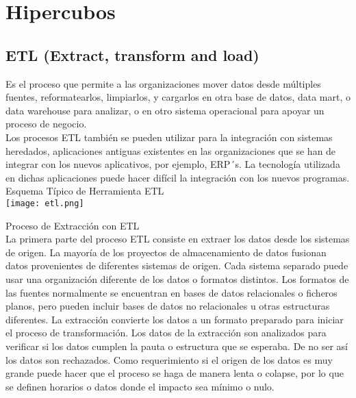 \documentclass[DIV=calc, paper=a4, fontsize=11pt, twocolumn]{scrartcl}	 %
\begin{document}





\section*{Hipercubos}

\subsection*{ETL (Extract, transform and load)}

Es el proceso que permite a las organizaciones mover datos desde m\'{u}ltiples fuentes, reformatearlos, limpiarlos, y cargarlos 
en otra base de datos, data mart, o data warehouse para analizar, o en otro sistema operacional para apoyar un proceso de negocio.\\
Los procesos ETL tambi\'{e}n se pueden utilizar para la integraci\'{o}n con sistemas heredados, aplicaciones antiguas existentes en 
las organizaciones que se han de integrar con los nuevos aplicativos, por ejemplo, ERP´s. La tecnolog\'{i}a utilizada en dichas 
aplicaciones puede hacer dif\'{i}cil la integraci\'{o}n con los nuevos programas.\\

Esquema T\'{i}pico de Herramienta ETL\\

\texttt{[image: etl.png]} 

Proceso de Extracci\'{o}n con ETL\\
La primera parte del proceso ETL consiste en extraer los datos desde los sistemas de origen. La mayor\'{i}a de los proyectos 
de almacenamiento de datos fusionan datos provenientes de diferentes sistemas de origen. Cada sistema separado puede usar
una organizaci\'{o}n diferente de los datos o formatos distintos. Los formatos de las fuentes normalmente se encuentran en 
bases de datos relacionales o ficheros planos, pero pueden incluir bases de datos no relacionales u otras estructuras 
diferentes. La extracci\'{o}n convierte los datos a un formato preparado para iniciar el proceso de transformaci\'{o}n.
Los datos de la extracci\'{o}n son analizados para verificar si los datos cumplen la pauta o estructura que se esperaba. De 
no ser as\'{i} los datos son rechazados. Como requerimiento si el origen de los datos es muy grande puede hacer que el 
proceso se haga de manera lenta o colapse, por lo que se definen horarios o datos donde el impacto sea m\'{i}nimo o nulo.\\
\end{document}
